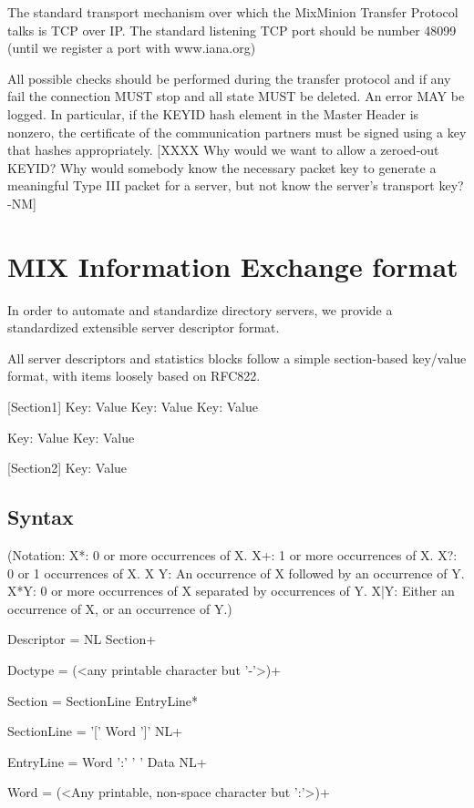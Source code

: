 The standard transport mechanism over which the MixMinion Transfer
Protocol talks is TCP over IP. The standard listening TCP port should be 
number 48099 (until we register a port with www.iana.org)

All possible checks should be performed during the transfer protocol
and if any fail the connection MUST stop and all state MUST
be deleted. An error MAY be logged. In particular, if the KEYID
hash element in the Master Header is nonzero, the certificate of
the communication partners must be signed using a key that hashes
appropriately.
[XXXX Why would we want to allow a zeroed-out KEYID?  Why would
  somebody know the necessary packet key to generate a meaningful
  Type III packet for a server, but not know the server's transport
  key? -NM]

\section{MIX Information Exchange format}

In order to automate and standardize directory servers, we provide 
a standardized extensible server descriptor format.

All server descriptors and statistics blocks follow a simple
section-based key/value format, with items loosely based on RFC822.

[Section1]
Key: Value
Key: Value
Key: Value

Key: Value
Key: Value

[Section2]
Key: Value

\subsection{Syntax}

(Notation:  X*: 0 or more occurrences of X.
            X+: 1 or more occurrences of X.
	    X?: 0 or 1 occurrences of X.
            X Y: An occurrence of X followed by an occurrence of Y.
	    X*{Y}: 0 or more occurrences of X separated by occurrences
                  of Y.
            X|Y: Either an occurrence of X, or an occurrence of Y.)

Descriptor = NL Section+ 

Doctype = (<any printable character but '-'>)+

Section = SectionLine EntryLine*

SectionLine = '[' Word ']' NL+

EntryLine = Word ':' ' ' Data NL+

Word = (<Any printable, non-space character but ':'>)+

